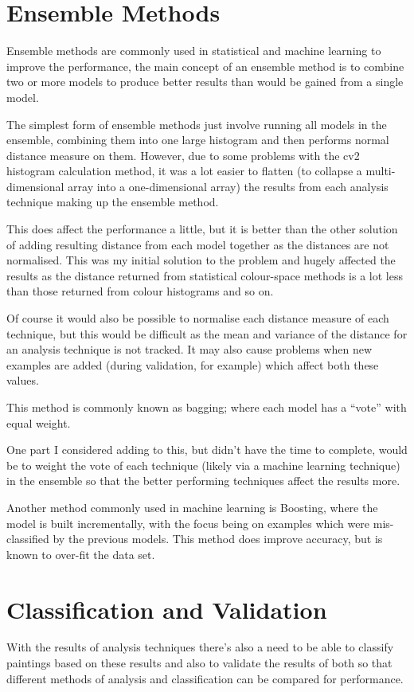 \section{Ensemble Methods}
Ensemble methods are commonly used in statistical and machine learning to improve the performance,
the main concept of an ensemble method is to combine two or more models to produce better results
than would be gained from a single model.

The simplest form of ensemble methods just involve running all models in the ensemble, combining them into
one large histogram and then performs normal distance measure on them. However, due to some 
problems with the \gls{cv2} histogram calculation method, it was a lot easier to flatten
(to collapse a multi-dimensional array into a one-dimensional array) the results from each 
analysis technique making up the ensemble method.

This does affect the performance a little, but it is better than the other solution of adding 
resulting distance from each model together as the distances are not normalised. This was my 
initial solution to the problem and hugely affected the results as the distance returned from
statistical colour-space methods is a lot less than those returned from colour histograms and so
on.

Of course it would also be possible to normalise each distance measure of each technique, but this
would be difficult as the mean and variance of the distance for an analysis technique is not 
tracked. It may also cause problems when new examples are added (during validation, for example)
which affect both these values.

This method is commonly known as \gls{bagging}; where each model has a ``vote'' with equal weight.

One part I considered adding to this, but didn't have the time to complete, would be to weight the
vote of each technique (likely via a machine learning technique) in the ensemble so that the 
better performing techniques affect the results more.

Another method commonly used in machine learning is Boosting, where the model is built 
incrementally, with the focus being on examples which were mis-classified by the previous models.
This method does improve accuracy, but is known to over-fit the data set. 


\section{Classification and Validation}
With the results of analysis techniques there's also a need to be able to classify paintings based
on these results and also to validate the results of both so that different methods of analysis
and classification can be compared for performance.

